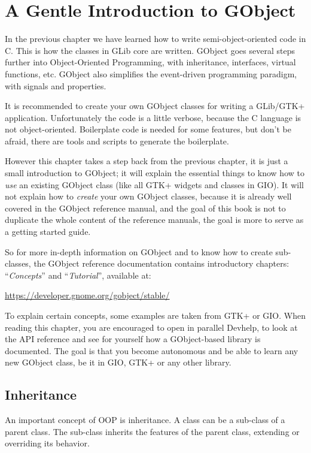 \chapter{A Gentle Introduction to GObject}
\label{oop-gobject}

In the previous chapter we have learned how to write semi-object-oriented code in C. This is how the classes in GLib core are written. GObject goes several steps further into Object-Oriented Programming, with inheritance, interfaces, virtual functions, etc. GObject also simplifies the event-driven programming paradigm, with signals and properties.

It is recommended to create your own GObject classes for writing a GLib/GTK+ application. Unfortunately the code is a little verbose, because the C language is not object-oriented. Boilerplate code is needed for some features, but don't be afraid, there are tools and scripts to generate the boilerplate.

However this chapter takes a step back from the previous chapter, it is just a small introduction to GObject; it will explain the essential things to know how to \emph{use} an existing GObject class (like all GTK+ widgets and classes in GIO). It will not explain how to \emph{create} your own GObject classes, because it is already well covered in the GObject reference manual, and the goal of this book is not to duplicate the whole content of the reference manuals, the goal is more to serve as a getting started guide.

So for more in-depth information on GObject and to know how to create sub-classes, the GObject reference documentation contains introductory chapters: ``\emph{Concepts}'' and ``\emph{Tutorial}'', available at:

\url{https://developer.gnome.org/gobject/stable/}

To explain certain concepts, some examples are taken from GTK+ or GIO. When reading this chapter, you are encouraged to open in parallel Devhelp, to look at the API reference and see for yourself how a GObject-based library is documented. The goal is that you become autonomous and be able to learn any new GObject class, be it in GIO, GTK+ or any other library.

\section{Inheritance}

An important concept of OOP is inheritance. A class can be a sub-class of a parent class. The sub-class inherits the features of the parent class, extending or overriding its behavior.

